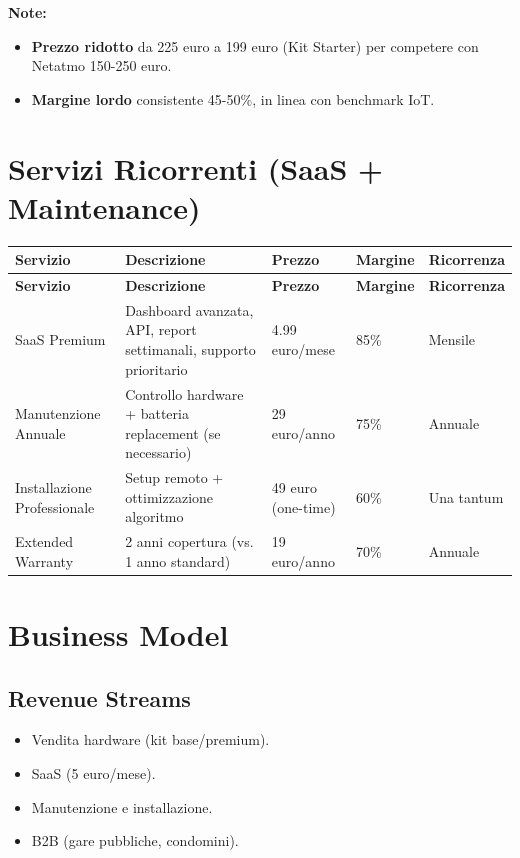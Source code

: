\documentclass[11pt,a4paper]{report}
\begin{document}
{\small \bf Note:}
\begin{itemize}
\item {\bf Prezzo ridotto} da 225 euro a 199 euro (Kit Starter) per competere con Netatmo 150-250 euro.
\item {\bf Margine lordo} consistente 45-50\%, in linea con benchmark IoT.
\end{itemize}

\section{Servizi Ricorrenti (SaaS + Maintenance)}
\begin{longtable}{|L{2.5cm}|L{3.5cm}|C{1.3cm}|C{1.3cm}|L{2cm}|}
\hline
{\bf Servizio} & {\bf Descrizione} & {\bf Prezzo} & {\bf Margine} & {\bf Ricorrenza} \\ \hline
\endfirsthead
\hline
{\bf Servizio} & {\bf Descrizione} & {\bf Prezzo} & {\bf Margine} & {\bf Ricorrenza} \\ \hline
\endhead
\endfoot
\endlastfoot
SaaS Premium & Dashboard avanzata, API, report settimanali, supporto prioritario & 4.99 euro/mese & 85\% & Mensile \\
Manutenzione Annuale & Controllo hardware + batteria replacement (se necessario) & 29 euro/anno & 75\% & Annuale \\
Installazione Professionale & Setup remoto + ottimizzazione algoritmo & 49 euro (one-time) & 60\% & Una tantum \\
Extended Warranty & 2 anni copertura (vs. 1 anno standard) & 19 euro/anno & 70\% & Annuale \\ \hline
\end{longtable}

\section{Business Model}
\subsection{Revenue Streams}
\begin{itemize}
\item Vendita hardware (kit base/premium).
\item SaaS (5 euro/mese).
\item Manutenzione e installazione.
\item B2B (gare pubbliche, condomini).
\end{itemize}
\end{document}

